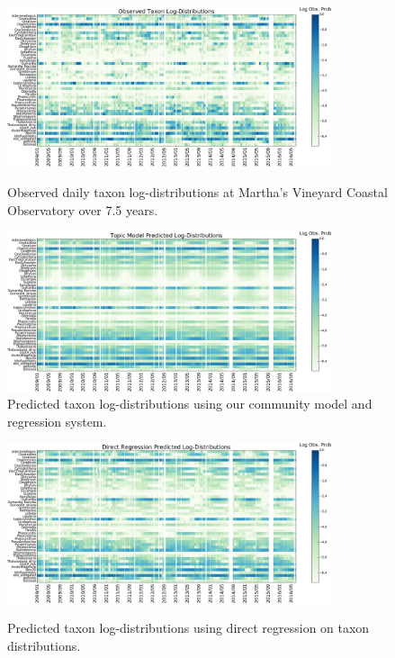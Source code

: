 \begin{figure}
    \centering
    \begin{subfloat}
        \centering
        \includegraphics[width=0.85\textwidth]{figures/oceans/taxa_distros_gt.png}
        \caption{Observed daily taxon log-distributions at Martha's Vineyard Coastal Observatory over 7.5 years.}
        \label{fig:plankton-mvco-gt}
    \end{subfloat}
    \begin{subfloat}
        \centering
        \includegraphics[width=0.85\textwidth]{figures/oceans/taxa_distros_hat_topics.png}
        \caption{Predicted taxon log-distributions using our community model and regression system.}
        \label{fig:plankton-mvco-topic-est}
    \end{subfloat}%
\end{figure}
\begin{figure}
	\ContinuedFloat
    \centering
    \begin{subfloat}
        \centering
        \includegraphics[width=0.85\textwidth]{figures/oceans/taxa_distros_hat_words.png}
        \caption{Predicted taxon log-distributions using direct regression on taxon distributions.}
        \label{fig:plankton-mvco-word-est}
    \end{subfloat}
    \caption{}
    \label{fig:plankton-mvco}
\end{figure}

